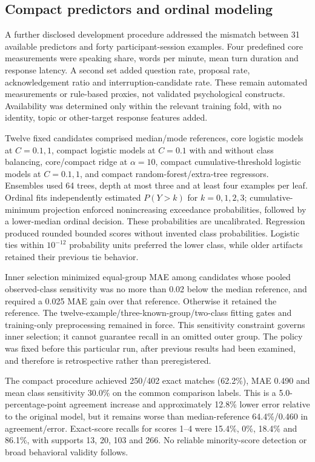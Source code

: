 \documentclass{article}
\begin{document}
\subsection{Compact predictors and ordinal modeling}
A further disclosed development procedure addressed the mismatch between 31 available predictors and forty participant-session examples. Four predefined core measurements were speaking share, words per minute, mean turn duration and response latency. A second set added question rate, proposal rate, acknowledgement ratio and interruption-candidate rate. These remain automated measurements or rule-based proxies, not validated psychological constructs. Availability was determined only within the relevant training fold, with no identity, topic or other-target response features added.

Twelve fixed candidates comprised median/mode references, core logistic models at $C=0.1,1$, compact logistic models at $C=0.1$ with and without class balancing, core/compact ridge at $\alpha=10$, compact cumulative-threshold logistic models at $C=0.1,1$, and compact random-forest/extra-tree regressors. Ensembles used 64 trees, depth at most three and at least four examples per leaf. Ordinal fits independently estimated $P(Y>k)$ for $k=0,1,2,3$; cumulative-minimum projection enforced nonincreasing exceedance probabilities, followed by a lower-median ordinal decision. These probabilities are uncalibrated. Regression produced rounded bounded scores without invented class probabilities. Logistic ties within $10^{-12}$ probability units preferred the lower class, while older artifacts retained their previous tie behavior.

Inner selection minimized equal-group MAE among candidates whose pooled observed-class sensitivity was no more than 0.02 below the median reference, and required a 0.025 MAE gain over that reference. Otherwise it retained the reference. The twelve-example/three-known-group/two-class fitting gates and training-only preprocessing remained in force. This sensitivity constraint governs inner selection; it cannot guarantee recall in an omitted outer group. The policy was fixed before this particular run, after previous results had been examined, and therefore is retrospective rather than preregistered.

The compact procedure achieved 250/402 exact matches (62.2\%), MAE 0.490 and mean class sensitivity 30.0\% on the common comparison labels. This is a 5.0-percentage-point agreement increase and approximately 12.8\% lower error relative to the original model, but it remains worse than median-reference 64.4\%/0.460 in agreement/error. Exact-score recalls for scores 1--4 were 15.4\%, 0\%, 18.4\% and 86.1\%, with supports 13, 20, 103 and 266. No reliable minority-score detection or broad behavioral validity follows.
\end{document}
